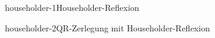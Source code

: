\begin{Algorithmus*}{householder-1}{Householder-Reflexion}
  
\end{Algorithmus*}

\begin{Algorithmus*}{householder-2}{QR-Zerlegung mit Householder-Reflexion}
  
\end{Algorithmus*}



